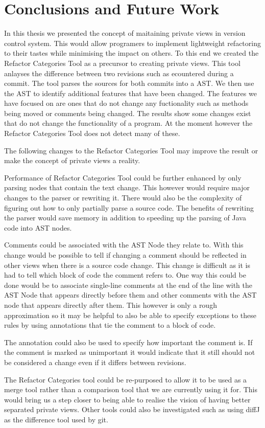 
\chapter{Conclusions and Future Work}\label{C:con}

In this thesis we presented the concept of maitaining private views in version control system. 
This would allow programers to implement lightweight refactoring to their tastes while minimising the impact on others.  
To this end we created the Refactor Categories Tool as a precursor to creating private views. 
This tool anlayses the difference between two revisions such as ecountered during a commit.  
The tool parses the sources for both commits into a AST. 
We then use the AST to identify additional features that have been changed. 
The features we have focused on are ones that do not change any fuctionality such as methods being moved or comments being changed. 
The results show some changes exist that do not change the functionality of a program.
At the moment however the Refactor Categories Tool does not detect many of these.  

The following changes to the Refactor Categories Tool may improve the result or make the concept of private views a reality.

Performance of Refactor Categories Tool could be further enhanced by only parsing nodes that contain the text change.  This however would require major changes to the parser or rewriting it. There would also be the complexity of figuring out how to only partially parse a source code. The benefits of rewriting the parser would save memory in addition to speeding up the parsing of Java code into AST nodes.


Comments could be associated with the AST Node they relate to.  With this change would be possible to tell if changing a comment should be reflected in other views when there is a source code change. This change is difficult as it is had to tell which block of code the comment refers to.  One way this could be done would be to associate single-line comments at the end of the line with the AST Node that appears directly before them and other comments with the AST node that appears directly after them.  This however is only a rough approximation so it may be helpful to also be able to specify exceptions to these rules by using annotations that tie the comment to a block of code.

The annotation could also be used to specify how important the comment is. If the comment is marked as unimportant it would indicate that it still should not be considered a change even if it differs between revisions.

The Refactor Categories tool could be re-purposed to allow it to be used as a merge tool rather than a comparison tool that we are currently using it for.  This would bring us a step closer to being able to realise the vision of having better separated private views.  Other tools could also be investigated such as using diffJ as the difference tool used by git.
% 
% 
% 
% 
% 
